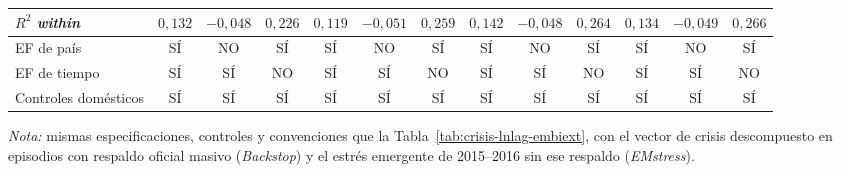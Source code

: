 \begin{landscape}
\begin{table}
\begin{adjustbox}{max width=\linewidth, max totalheight=\tablaalto\textheight}
\begin{tabular}{l c ccc ccc ccc cc}
$R^2$ \textit{within} & $0{,}132$ & $-0{,}048$ & $0{,}226$ & $0{,}119$ & $-0{,}051$ & $0{,}259$ & $0{,}142$ & $-0{,}048$ & $0{,}264$ & $0{,}134$ & $-0{,}049$ & $0{,}266$ \\
\midrule
EF de país & SÍ & NO & SÍ & SÍ & NO & SÍ & SÍ & NO & SÍ & SÍ & NO & SÍ \\
EF de tiempo & SÍ & SÍ & NO & SÍ & SÍ & NO & SÍ & SÍ & NO & SÍ & SÍ & NO \\
Controles domésticos & SÍ & SÍ & SÍ & SÍ & SÍ & SÍ & SÍ & SÍ & SÍ & SÍ & SÍ & SÍ \\
\bottomrule
\end{tabular}
\end{adjustbox}
\par\smallskip\parbox{\linewidth}{\scriptsize \textit{Nota:} mismas especificaciones, controles y convenciones que la Tabla~\ref{tab:crisis-lnlag-embiext}, con el vector de crisis descompuesto en episodios con respaldo oficial masivo (\textit{Backstop}) y el estrés emergente de 2015--2016 sin ese respaldo (\textit{EMstress}).}
\end{table}
\end{landscape}
